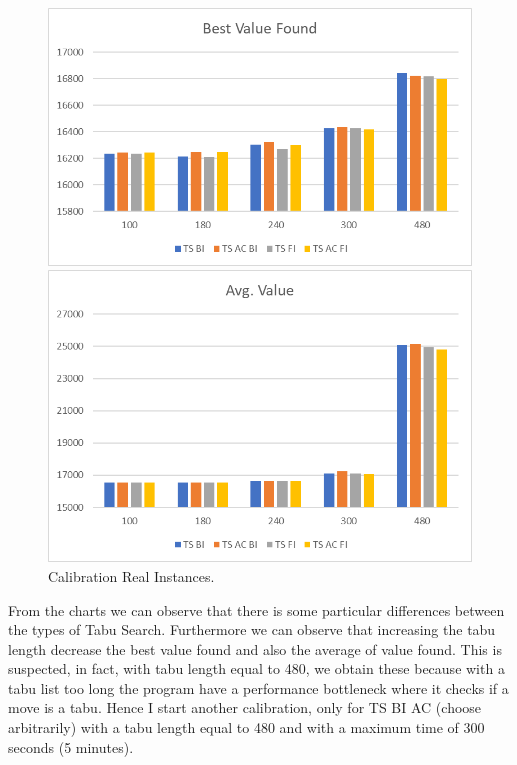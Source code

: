 			\begin{figure} [p]
				\centering
				\includegraphics[width=\linewidth]{img/RI-calibration-SC}
				\vspace{1cm}
				
				\includegraphics[width=\linewidth]{img/RI-calibration-SC-avg}
				
				\caption{Calibration Real Instances.}
				\label{fig:ri-calibration-sc}
			\end{figure}
		
			From the charts we can observe that there is some particular differences between the types of Tabu Search. 
			Furthermore we can observe that increasing the tabu length decrease the best value found and also the average of value found. This is suspected, in fact, with tabu length equal to 480, we obtain these because with a tabu list too long the program have a performance bottleneck where it checks if a move is a tabu. Hence I start another calibration, only for TS BI AC (choose arbitrarily) with a tabu length equal to 480 and with a maximum time of 300 seconds (5 minutes).
			
